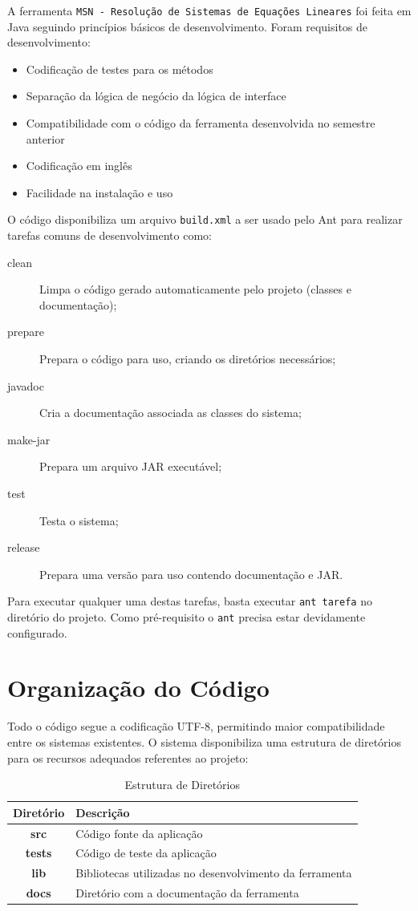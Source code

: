 \documentclass[a4paper,10pt]{report}
\newcommand{\ferramenta}{\texttt{MSN - Resolução de Sistemas de Equações Lineares}\xspace}
\begin{document}
A ferramenta \ferramenta foi feita em Java seguindo princípios básicos de desenvolvimento. Foram requisitos de desenvolvimento:

\begin{itemize}
 \item Codificação de testes para os métodos
 \item Separação da lógica de negócio da lógica de interface
 \item Compatibilidade com o código da ferramenta desenvolvida no semestre anterior\cite{msnlab}
 \item Codificação em inglês
 \item Facilidade na instalação e uso
\end{itemize}

O código disponibiliza um arquivo \texttt{build.xml} a ser usado pelo Ant\cite{ant} para realizar tarefas comuns de desenvolvimento como:

\begin{description}
 \item[clean] Limpa o código gerado automaticamente pelo projeto (classes e documentação);
 \item[prepare] Prepara o código para uso, criando os diretórios necessários;
 \item[javadoc] Cria a documentação associada as classes do sistema;
 \item[make-jar] Prepara um arquivo JAR executável;
 \item[test] Testa o sistema;
 \item[release] Prepara uma versão para uso contendo documentação e JAR.
 \end{description}

Para executar qualquer uma destas tarefas, basta executar \texttt{ant tarefa} no diretório do projeto. Como pré-requisito o \texttt{ant} precisa estar devidamente configurado.

\section{Organização do Código}

Todo o código segue a codificação UTF-8, permitindo maior compatibilidade entre os sistemas existentes. O sistema disponibiliza uma estrutura de diretórios para os recursos adequados referentes ao projeto:

\begin{table}[h]
\centering
\caption{Estrutura de Diretórios}
        \begin{tabular}{|c|p{2in}|}
        \hline
        \textbf{Diretório} & \textbf{Descrição} \\ \hline
        \textbf{src} & Código fonte da aplicação \\ \hline
        \textbf{tests} & Código de teste da aplicação \\ \hline
        \textbf{lib} & Bibliotecas utilizadas no desenvolvimento da ferramenta \\ \hline
        \textbf{docs} & Diretório com a documentação da ferramenta \\ \hline
        \end{tabular}
\label{tab:diretorios}
\end{table} 
\end{document}
